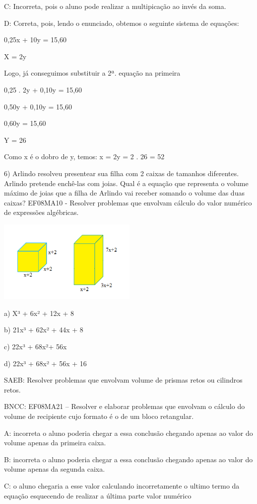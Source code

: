 C: Incorreta, pois o aluno pode realizar a multipicação ao invés da
soma.

D: Correta, pois, lendo o enunciado, obtemos o seguinte sistema de
equações:

0,25x + 10y = 15,60

X = 2y

Logo, já conseguimos substituir a 2ª. equação na primeira

0,25 . 2y + 0,10y = 15,60

0,50y + 0,10y = 15,60

0,60y = 15,60

Y = 26

Como x é o dobro de y, temos: x = 2y = 2 . 26 = 52

6) Arlindo resolveu presentear sua filha com 2 caixas de tamanhos
diferentes. Arlindo pretende enchê-las com joias. Qual é a equação que
representa o volume máximo de joias que a filha de Arlindo vai receber
somando o volume das duas caixas? EF08MA10 - Resolver problemas que
envolvam cálculo do valor numérico de expressões algébricas.

\includegraphics[width=2.63333in,height=1.56545in]{./imgSAEB_8_MAT/media/image55.png}

a) X³ + 6x² + 12x + 8

b) 21x³ + 62x² + 44x + 8

c) 22x³ + 68x²+ 56x

d) 22x³ + 68x² + 56x + 16

SAEB: Resolver problemas que envolvam volume de prismas retos ou
cilindros retos.

BNCC: EF08MA21 -- Resolver e elaborar problemas que envolvam o cálculo
do volume de recipiente cujo formato é o de um bloco retangular.

A: incorreta o aluno poderia chegar a essa conclusão chegando apenas ao
valor do volume apenas da primeira caixa.

B: incorreta o aluno poderia chegar a essa conclusão chegando apenas ao
valor do volume apenas da segunda caixa.

C: o aluno chegaria a esse valor calculando incorretamente o ultimo
termo da equação esquecendo de realizar a última parte valor numérico

